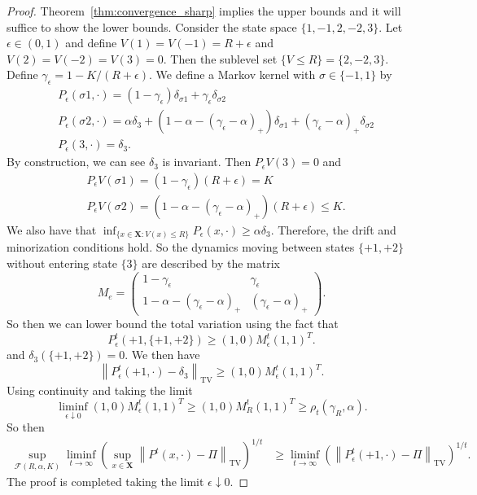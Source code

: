 \documentclass[ejsv2, noshowframe]{imsart}
\theoremstyle{plain}
\theoremstyle{definition}
\theoremstyle{remark}
\newcommand{\norm}[1]{\left\lVert#1\right\rVert}
\newcommand{\e}{\epsilon}
\renewcommand{\P}{P}
\newcommand{\X}{\textbf{X}}
\begin{document}
\begin{proof}
Theorem~\ref{thm:convergence_sharp} implies the upper bounds and it will suffice to show the lower bounds.
Consider the state space $\{ 1, -1, 2, -2, 3 \}$.
Let $\e \in (0, 1)$ and define $V(1) = V(-1) = R + \e$ and $V(2) = V(-2) = V(3) = 0$.
Then the sublevel set $\{ V \le R \} = \{ 2, -2, 3 \}$.
Define $\gamma_\e = 1 - K / (R + \e)$.
We define a Markov kernel with $\sigma \in \{-1, 1\}$ by
\begin{align*}
&\P_\e(\sigma 1, \cdot) = (1 - \gamma_\e) \delta_{\sigma 1} + \gamma_\e \delta_{\sigma 2}
\\
&\P_\e(\sigma 2, \cdot) = \alpha \delta_{3} + ( 1 - \alpha - (\gamma_\e - \alpha)_+ ) \delta_{\sigma 1} + (\gamma_\e - \alpha)_+ \delta_{\sigma 2}
\\
&\P_\e(3, \cdot) = \delta_{3}.
\end{align*}
By construction, we can see $\delta_{3}$ is invariant.
Then $\P_\e V(3) = 0$ and
\begin{align*}
&\P_\e V(\sigma 1) = (1 - \gamma_\e) (R + \e) = K
\\
&\P_\e V(\sigma 2) = ( 1 - \alpha - (\gamma_\e - \alpha)_+ ) (R + \e)
\le K.
\end{align*}
We also have that
$
\inf_{ \{ x \in \X : V(x) \le R \} } \P_\e(x, \cdot)
\ge \alpha \delta_3.
$
Therefore, the drift and minorization conditions hold.
So the dynamics moving between states $\{+ 1, + 2 \}$ without entering state $\{ 3 \}$ are described by the matrix
\[
M_e
=
\begin{pmatrix}
1 - \gamma_\e & \gamma_\e \\
1 - \alpha - (\gamma_\e - \alpha)_+ & (\gamma_\e - \alpha)_+
\end{pmatrix}.
\]
So then we can lower bound the total variation using the fact that
\[
\P_{\e}^t(+1, \{+1, +2 \})
\ge (1, 0) M_{\e}^t (1, 1)^T.
\]
and $\delta_{3}(\{+1, +2\}) = 0$.
We then have
\[
\norm{ \P_\e^t(+1, \cdot) - \delta_{3} }_{\text{TV}}
\ge (1, 0) M_{\e}^t (1, 1)^T.
\]
Using continuity and taking the limit 
\[
\liminf_{\e \downarrow 0} (1, 0) M_{\e}^t (1, 1)^T 
\ge (1, 0) M_{R}^t (1, 1)^T 
\ge \rho_t(\gamma_R, \alpha).
\]
So then
\begin{align*}
\sup_{\mathcal{F}(R, \alpha, K)} 
\liminf_{t \to \infty} \left( \sup_{x \in \X} \norm{ \P^t(x, \cdot) - \Pi  }_{\text{TV}} \right)^{1/t}
&\ge \liminf_{t \to \infty} \left( \norm{ \P_\e^t(+1, \cdot) - \Pi  }_{\text{TV}} \right)^{1/t}.
\end{align*}
The proof is completed taking the limit $\e \downarrow 0$.
\end{proof}
\end{document}

